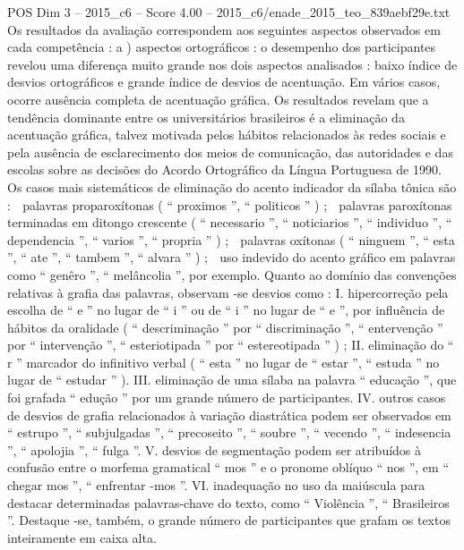 \begin{textsample}{POS Dim 3 – 2015\_c6 – Score 4.00 – 2015\_c6/enade\_2015\_teo\_839aebf29e.txt}
Os resultados da avaliação correspondem aos seguintes aspectos observados em cada competência : a ) aspectos ortográficos : o desempenho dos participantes revelou uma diferença muito grande nos dois aspectos analisados : baixo índice de desvios ortográficos e grande índice de desvios de acentuação.
Em vários casos, ocorre ausência completa de acentuação gráfica.
Os resultados revelam que a tendência dominante entre os universitários brasileiros é a eliminação da acentuação gráfica, talvez motivada pelos hábitos relacionados às redes sociais e pela ausência de esclarecimento dos meios de comunicação, das autoridades e das escolas sobre as decisões do Acordo Ortográfico da Língua Portuguesa de 1990.
Os casos mais sistemáticos de eliminação do acento indicador da sílaba tônica são :  palavras proparoxítonas ( “ proximos ”, “ politicos ” ) ;  palavras paroxítonas terminadas em ditongo crescente ( “ necessario ”, “ noticiarios ”, “ individuo ”, “ dependencia ”, “ varios ”, “ propria ” ) ;  palavras oxítonas ( “ ninguem ”, “ esta ”, “ ate ”, “ tambem ”, “ alvara ” ) ;  uso indevido do acento gráfico em palavras como “ genêro ”, “ melâncolia ”, por exemplo.
Quanto ao domínio das convenções relativas à grafia das palavras, observam -se desvios como : I. hipercorreção pela escolha de “ e ” no lugar de “ i ” ou de “ i ” no lugar de “ e ”, por influência de hábitos da oralidade ( “ descriminação ” por “ discriminação ”, “ entervenção ” por “ intervenção ”, “ esteriotipada ” por “ estereotipada ” ) ; II. eliminação do “ r ” marcador do infinitivo verbal ( “ esta ” no lugar de “ estar ”, “ estuda ” no lugar de “ estudar ” ).
III. eliminação de uma sílaba na palavra “ educação ”, que foi grafada “ edução ” por um grande número de participantes.
IV. outros casos de desvios de grafia relacionados à variação diastrática podem ser observados em “ estrupo ”, “ subjulgadas ”, “ precoseito ”, “ soubre ”, “ vecendo ”, “ indesencia ”, “ apolojia ”, “ fulga ”.
V. desvios de segmentação podem ser atribuídos à confusão entre o morfema gramatical “ mos ” e o pronome oblíquo “ nos ”, em “ chegar mos ”, “ enfrentar -mos ”.
VI. inadequação no uso da maiúscula para destacar determinadas palavras-chave do texto, como “ Violência ”, “ Brasileiros ”.
Destaque -se, também, o grande número de participantes que grafam os textos inteiramente em caixa alta.

\end{textsample}
